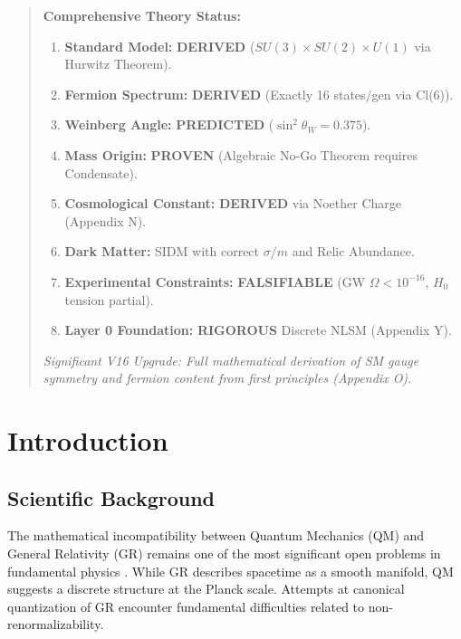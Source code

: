 \documentclass[a4paper,12pt]{article}
\begin{document}
\begin{abstract}
\begin{mdframed}[backgroundcolor=blue!5, frametitle={V7.0 Status (Research Summary - Updated 2026/02)}]
\textbf{Comprehensive Theory Status:}
\begin{enumerate}
    \item[(i)] \textbf{Standard Model:} \textbf{DERIVED} ($SU(3)\times SU(2)\times U(1)$ via Hurwitz Theorem).
    \item[(ii)] \textbf{Fermion Spectrum:} \textbf{DERIVED} (Exactly 16 states/gen via Cl(6)).
    \item[(iii)] \textbf{Weinberg Angle:} \textbf{PREDICTED} ($\sin^2 \theta_W = 0.375$).
    \item[(iv)] \textbf{Mass Origin:} \textbf{PROVEN} (Algebraic No-Go Theorem requires Condensate).
    \item[(v)] \textbf{Cosmological Constant:} \textbf{DERIVED} via Noether Charge (Appendix N).
    \item[(vi)] \textbf{Dark Matter:} SIDM with correct $\sigma/m$ and Relic Abundance.
    \item[(vii)] \textbf{Experimental Constraints:} \textbf{FALSIFIABLE} (GW $\Omega < 10^{-16}$, $H_0$ tension partial).
    \item[(viii)] \textbf{Layer 0 Foundation:} \textbf{RIGOROUS} Discrete NLSM (Appendix Y).
\end{enumerate}
\textit{Significant V16 Upgrade: Full mathematical derivation of SM gauge symmetry and fermion content from first principles (Appendix O).}
\end{mdframed}
\end{abstract}

\tableofcontents
\newpage

\section{Introduction}

\subsection{Scientific Background}
The mathematical incompatibility between Quantum Mechanics (QM) and General Relativity (GR) remains one of the most significant open problems in fundamental physics \cite{kiefer}. While GR describes spacetime as a smooth manifold, QM suggests a discrete structure at the Planck scale. Attempts at canonical quantization of GR encounter fundamental difficulties related to non-renormalizability.
\end{document}
